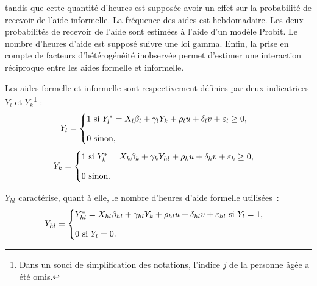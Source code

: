 \begin{Article}
\begin{refsection}[Bonnal]
tandis que cette quantité d'heures est supposée avoir un effet sur la probabilité de recevoir de l'aide informelle. La fréquence des aides est hebdomadaire. Les deux probabilités de recevoir de l'aide sont estimées à l'aide d'un modèle Probit. Le nombre d'heures d'aide est supposé suivre une loi gamma. Enfin, la prise en compte de facteurs d'hétérogénéité inobservée permet d'estimer une interaction réciproque entre les aides formelle et informelle.

Les aides formelle et informelle sont respectivement définies par deux indicatrices $Y_{l}$ et $Y_{k}$\footnote{Dans un souci de simplification des notations, l'indice $j$ de la personne âgée a été omis.} :
\begin{equation}\label{prob_aideFormelle}
	Y_{l} = 
	\begin{cases}
		1 \text{ si } Y_{l}^* = X_{l}\beta_{l} + \gamma_{l}Y_{k} + \rho_{l}u + \delta_{l}v + \varepsilon_{l} \geq 0, \vspace{.3cm}\\
		0 \text{ sinon,}
	\end{cases}
\end{equation}
\begin{equation}\label{prob_aideInformelle}
	Y_{k} = 
	\begin{cases}
		1 \text{ si } Y_{k}^* = X_{k}\beta_{k} + \gamma_{k}Y_{hl} + \rho_{k}u + \delta_{k}v + \varepsilon_{k} \geq 0, \vspace{.3cm}\\
		0 \text{ sinon.}
	\end{cases}
\end{equation}

$Y_{hl}$ caractérise, quant à elle, le nombre d'heures d'aide formelle utilisées~: 
\begin{equation}\label{heures_aideFormelle}
	Y_{hl} = 
	\begin{cases}
		Y_{hl}^* = X_{hl}\beta_{hl} + \gamma_{hl}Y_{k} + \rho_{hl}u + \delta_{hl}v + \varepsilon_{hl} \text{ si } Y_{l} = 1, \vspace{.3cm}\\
		0 \text{ si } Y_{l} = 0.
	\end{cases}
\end{equation}


\end{refsection}
\end{Article}
